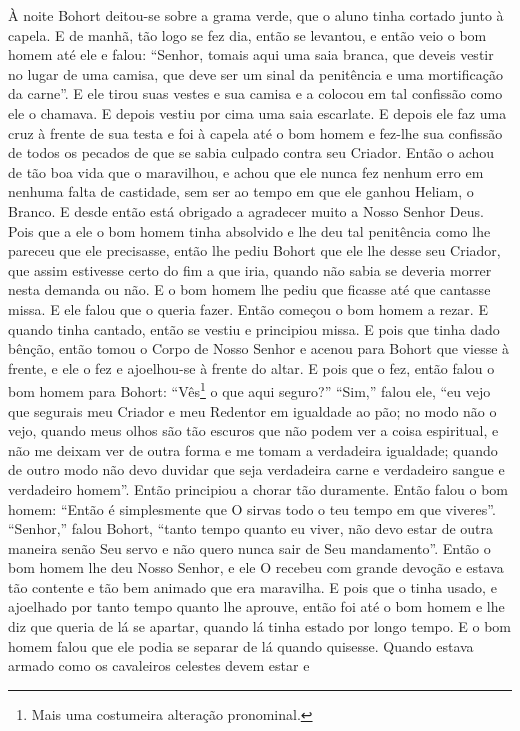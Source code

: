 À noite Bohort deitou-se sobre a grama verde, que o aluno tinha cortado junto à
capela. E de manhã, tão logo se fez dia, então se levantou, e então veio o bom
homem até ele e falou: “Senhor, tomais aqui uma saia branca, que deveis vestir
no lugar de uma camisa, que deve ser um sinal da penitência e uma mortificação
da carne”. E ele tirou suas vestes e sua camisa e a colocou em tal
confissão como ele o chamava. E depois vestiu por cima uma saia escarlate. E
depois ele faz uma cruz à frente de sua testa e foi à capela até o bom homem e
fez-lhe sua confissão de todos os pecados de que se sabia culpado contra seu
Criador. Então o achou de tão boa vida que o maravilhou, e achou que ele nunca
fez nenhum erro em nenhuma falta de castidade, sem ser ao tempo em que ele
ganhou Heliam, o Branco. E desde então está obrigado a agradecer muito a Nosso
Senhor Deus. Pois que a ele o bom homem tinha absolvido e lhe deu tal
penitência como lhe pareceu que ele precisasse, então lhe pediu Bohort que ele
lhe desse seu Criador, que assim estivesse certo do fim a que iria, quando não
sabia se deveria morrer nesta demanda ou não. E o bom homem lhe pediu que
ficasse até que cantasse missa. E ele falou que o queria fazer. Então começou o
bom homem a rezar. E quando tinha cantado, então se vestiu e principiou missa.
E pois que tinha dado bênção, então tomou o Corpo de Nosso Senhor e acenou para
Bohort que viesse à frente, e ele o fez e ajoelhou-se à frente do altar. E pois
que o fez, então falou o bom homem para Bohort: “Vês\footnote{ Mais uma
costumeira alteração pronominal.}  o que aqui seguro?” “Sim,”
falou ele, “eu vejo que segurais meu Criador e meu Redentor em igualdade ao
pão; no modo não o vejo, quando meus olhos são tão escuros que não podem ver a
coisa espiritual, e não me deixam ver de outra forma e me tomam a verdadeira
igualdade; quando de outro modo não devo duvidar que seja verdadeira carne e
verdadeiro sangue e verdadeiro homem”. Então principiou a chorar tão
duramente. Então falou o bom homem: “Então é simplesmente que O sirvas todo o
teu tempo em que viveres”. “Senhor,” falou Bohort, ``tanto tempo quanto eu viver,
não devo estar de outra maneira senão Seu servo e não quero nunca sair de Seu
mandamento”. Então o bom homem lhe deu Nosso Senhor, e ele O recebeu
com grande devoção e estava tão contente e tão bem animado que era maravilha. E
pois que o tinha usado, e ajoelhado por tanto tempo quanto lhe aprouve, então
foi até o bom homem e lhe diz que queria de lá se apartar, quando lá tinha
estado por longo tempo. E o bom homem falou que ele podia se separar de lá
quando quisesse. Quando estava armado como os cavaleiros celestes devem estar e
